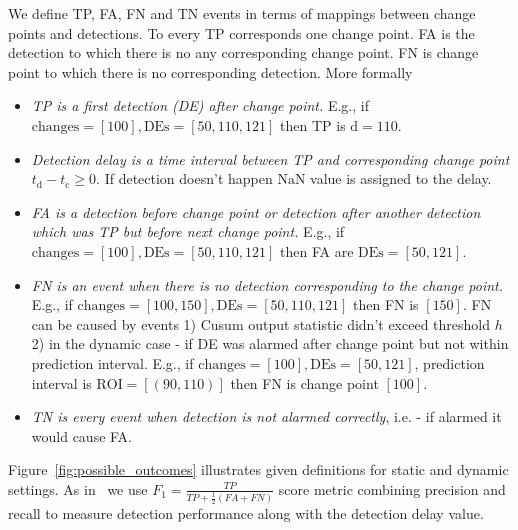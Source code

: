 \begin{definition}
	We define TP, FA, FN and TN events in terms of mappings between change points and detections.
	To every TP corresponds one change point.
	FA is the detection to which there is no any corresponding change point.
	FN is change point to which there is no corresponding detection.
	More formally
	\begin{itemize}
    \item \textit{TP is a first detection (DE) after change point.} E.g., if $\text{changes}=[100], \text{DEs}=[50, 110, 121]$ then TP is $\text{d} =110$.

    \item \textit{Detection delay is a time interval between TP and corresponding change point} $t_{\text{d}} - t_{\text{c}} \geq 0$. If detection doesn't happen $\text{NaN}$ value is assigned to the delay.

    \item \textit{FA is a detection before change point or detection after another detection which was TP but before next change point.} E.g., if $\text{changes}=[100], \text{DEs}=[50, 110, 121]$ then FA are $\text{DEs} = [50, 121]$.

    \item \textit{FN is an event when there is no detection corresponding to the change point.} E.g., if $\text{changes}=[100, 150], \text{DEs}=[50, 110, 121]$ then FN is $[150]$. FN can be caused by events 1) Cusum output statistic didn't exceed threshold $h$ 2) in the dynamic case - if DE was alarmed after change point but not within prediction interval. E.g., if $\text{changes}=[100], \text{DEs}=[50, 121]$, prediction interval is $\text{ROI}=[(90, 110)]$ then FN is change point $[100]$.

    \item \textit{TN is every event when detection is not alarmed correctly}, i.e. - if alarmed it would cause FA.

\end{itemize}
\end{definition}
Figure~\ref{fig:possible_outcomes} illustrates given definitions for static and dynamic settings. As in~\cite{plasse2021streaming} we use $F_1=\frac{TP}{TP+\frac{1}{2}(FA+FN)}$ score metric combining precision and recall to measure detection performance along with the detection delay value.

